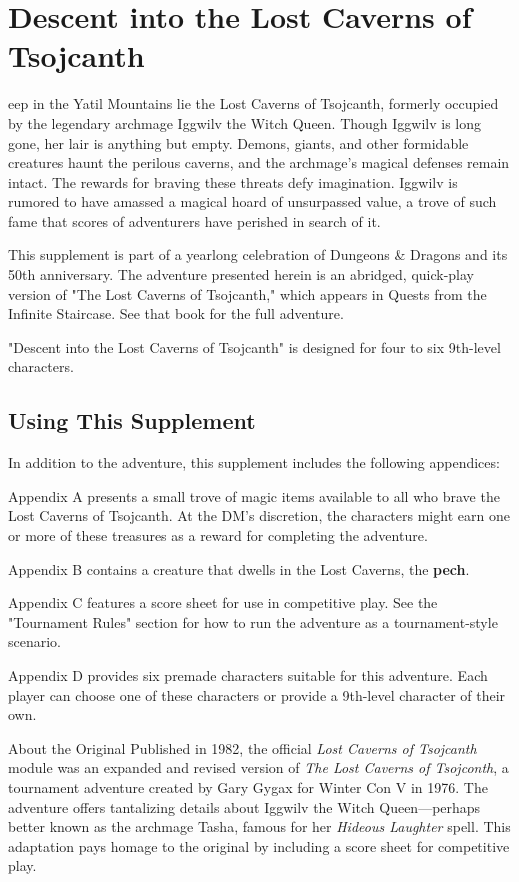 \documentclass[10pt,a4paper,twoside,bg=print,twocolumn,openany,nodeprecatedcode]{dndbook}
\date{}
\begin{document}
\frontmatter
\tableofcontents
\mainmatter
\chapter{Descent into the Lost Caverns of Tsojcanth}
eep in the Yatil Mountains lie the Lost Caverns of Tsojcanth, formerly occupied by the legendary archmage Iggwilv the Witch Queen. Though Iggwilv is long gone, her lair is anything but empty. Demons, giants, and other formidable creatures haunt the perilous caverns, and the archmage's magical defenses remain intact. The rewards for braving these threats defy imagination. Iggwilv is rumored to have amassed a magical hoard of unsurpassed value, a trove of such fame that scores of adventurers have perished in search of it.


This supplement is part of a yearlong celebration of Dungeons \& Dragons and its 50th anniversary. The adventure presented herein is an abridged, quick-play version of "The Lost Caverns of Tsojcanth," which appears in Quests from the Infinite Staircase. See that book for the full adventure.

"Descent into the Lost Caverns of Tsojcanth" is designed for four to six 9th-level characters.

\section{Using This Supplement}
In addition to the adventure, this supplement includes the following appendices:

Appendix A presents a small trove of magic items available to all who brave the Lost Caverns of Tsojcanth. At the DM's discretion, the characters might earn one or more of these treasures as a reward for completing the adventure.

Appendix B contains a creature that dwells in the Lost Caverns, the \textbf{pech}.

Appendix C features a score sheet for use in competitive play. See the "Tournament Rules" section for how to run the adventure as a tournament-style scenario.

Appendix D provides six premade characters suitable for this adventure. Each player can choose one of these characters or provide a 9th-level character of their own.

\begin{DndReadAloud}{About the Original}
Published in 1982, the official \textit{Lost Caverns of Tsojcanth} module was an expanded and revised version of \textit{The Lost Caverns of Tsojconth}, a tournament adventure created by Gary Gygax for Winter Con V in 1976. The adventure offers tantalizing details about Iggwilv the Witch Queen—perhaps better known as the archmage Tasha, famous for her \textit{Hideous Laughter} spell. This adaptation pays homage to the original by including a score sheet for competitive play.

\end{DndReadAloud}
\end{document}
